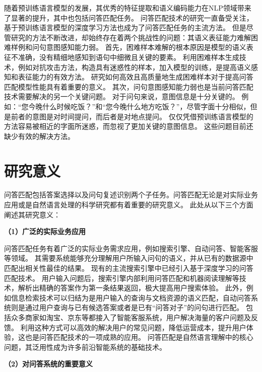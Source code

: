 随着预训练语言模型的发展，其优秀的特征提取和语义编码能力在NLP领域带来了显著的提升，其中也包括问答匹配任务。
问答匹配技术的研究一直备受关注，基于预训练语言模型的深度学习方法也成为了问答匹配任务的主流方法。
但是尽管研究的方法不断改进，却始终存在着两个挑战性的问题：其语义表征能力难解困难样例和问句意图感知能力弱。
首先，困难样本难解的根本原因是模型的语义表征不准确，没有精细地感知到语句中细微且关键的要素。
利用困难样本生成技术，例如对抗攻击方法，构造具有迷惑性的样本，加入模型的训练，是提高语义感知和表征能力的有效方法。
研究如何高效且高质量地生成困难样本对于提高问答匹配模型性能具有着重要的意义。
其次，问句意图感知能力弱也是当前问答匹配技术需要解决的另一个关键问题。
对于问句来说，意图信息是十分关键的。
例如：“您今晚什么时候吃饭？”和“您今晚什么地方吃饭？”，尽管字面十分相似，但是前者的意图是对时间提问，而后者是对地点提问。
仅仅凭借预训练语言模型的方法容易被相近的字面所迷惑，而忽视了更加关键的意图信息。
这些问题目前还缺少有效的解决方法。



\section{研究意义}
问答匹配包括答案选择以及问句复述识别两个子任务。问答匹配无论是对实际业务应用或是自然语言处理的科学研究都有着重要的研究意义。
此处从以下三个方面阐述其研究意义：

\textbf{\songti（1）广泛的实际业务应用}

问答匹配任务有着广泛的实际业务需求应用，例如搜索引擎、自动问答、智能客服等领域。
其需要系统能够充分理解用户所输入问句的语义，并从已有的数据源中匹配出相关性最佳的结果。
现有的主流搜索引擎中已经引入基于深度学习的问答匹配技术。
用户输入问题后，搜索引擎内部利用问答匹配和机器阅读理解等技术，解析出精确的答案作为第一条结果返回，极大提高用户搜索体验。
此外，例如信息检索技术可以归结为是用户输入的查询与文档资源的语义匹配，自动问答系统则是通过用户查询与已有候选答案或者是已有“问答对子”的问句进行匹配。
包括众多商家如淘宝、京东等都接入了智能客服系统，用户解决海量的客户问题及反馈。
利用这种方式可以高效的解决用户的常见问题，降低运营成本，提升用户体验，这也是问答匹配技术的一项成熟的应用。
问答匹配是自然语言理解中的核心问题，其泛用性成为许多前沿智能系统的基础技术。


\textbf{\songti（2）对问答系统的重要意义}

